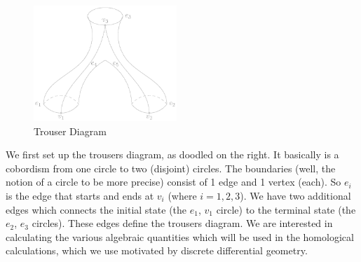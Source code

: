 
\begin{figure}
  \begin{center}
    \includegraphics[width=0.48\textwidth]{img/img0.eps}
  \end{center}
  \caption{\footnotesize {Trouser Diagram}}
\end{figure}
We first set up the trousers diagram, as doodled on the right. It
basically is a cobordism from one circle to two (disjoint)
circles. The boundaries (well, the notion of a circle to be more
precise) consist of 1 edge and 1 vertex (each). So $e_{i}$ is the
edge that starts and ends at $v_{i}$ (where $i=1,2,3$). We have
two additional edges which connects the initial state (the
$e_{1}$, $v_{1}$ circle) to the terminal state (the $e_{2}$,
$e_{3}$ circles). These edges define the trousers diagram. We are
interested in calculating the various algebraic quantities which
will be used in the homological calculations, which we use
motivated by discrete differential geometry.

